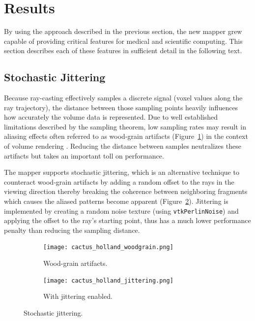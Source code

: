 \section{Results}
By using the approach described in the previous section, the new mapper grew
capable of providing critical features for medical and scientific computing.
This section describes each of these features in sufficient detail in the
following text.

\newcommand{\ignore}[1]{}

\subsection{Stochastic Jittering}
Because ray-casting effectively samples a discrete signal (voxel values along
the ray trajectory), the distance between those sampling points heavily
influences how accurately the volume data is represented.  Due to well
established limitations described by the sampling theorem, low sampling rates
may result in aliasing effects often referred to as wood-grain artifacts
(Figure~\ref{fig:jittering_without}) in the context of volume rendering
\ignore{\cite{RTVG_jittering}}. Reducing the distance between samples
neutralizes these artifacts but takes an important toll on performance.

The mapper supports stochastic jittering, which is an alternative technique to
counteract wood-grain artifacts by adding a random offset to the rays in the
viewing direction thereby breaking the coherence between neighboring fragments
which causes the aliased patterns become apparent (Figure~\ref{fig:jittering_with}).
Jittering is implemented by creating a random noise texture (using
\texttt{vtkPerlinNoise}) and applying the offset to the ray's starting point,
thus has a much lower performance penalty than reducing the sampling distance.

\begin{figure}[h]
\centering
  \begin{subfigure}[b]{.5\columnwidth}
    \centering
    \texttt{[image: cactus\_holland\_woodgrain.png]}
    \caption{Wood-grain artifacts.}
    \label{fig:jittering_without}
  \end{subfigure}%
  \begin{subfigure}[b]{.5\columnwidth}
    \centering
    \texttt{[image: cactus\_holland\_jittering.png]}
    \caption{With jittering enabled.}
    \label{fig:jittering_with}
  \end{subfigure}
  \caption{Stochastic jittering.}
  \label{fig:jittering}
\end{figure}

